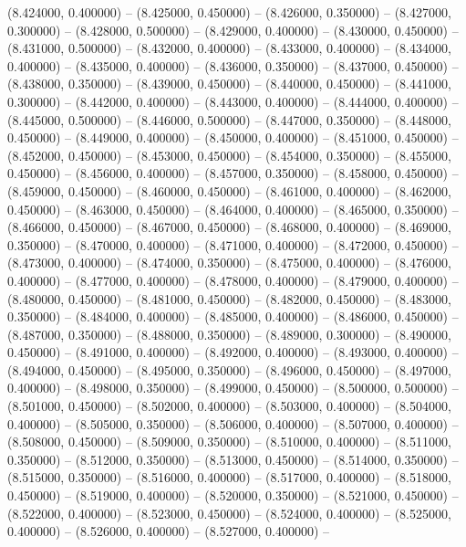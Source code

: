 (8.424000, 0.400000) -- 
(8.425000, 0.450000) -- 
(8.426000, 0.350000) -- 
(8.427000, 0.300000) -- 
(8.428000, 0.500000) -- 
(8.429000, 0.400000) -- 
(8.430000, 0.450000) -- 
(8.431000, 0.500000) -- 
(8.432000, 0.400000) -- 
(8.433000, 0.400000) -- 
(8.434000, 0.400000) -- 
(8.435000, 0.400000) -- 
(8.436000, 0.350000) -- 
(8.437000, 0.450000) -- 
(8.438000, 0.350000) -- 
(8.439000, 0.450000) -- 
(8.440000, 0.450000) -- 
(8.441000, 0.300000) -- 
(8.442000, 0.400000) -- 
(8.443000, 0.400000) -- 
(8.444000, 0.400000) -- 
(8.445000, 0.500000) -- 
(8.446000, 0.500000) -- 
(8.447000, 0.350000) -- 
(8.448000, 0.450000) -- 
(8.449000, 0.400000) -- 
(8.450000, 0.400000) -- 
(8.451000, 0.450000) -- 
(8.452000, 0.450000) -- 
(8.453000, 0.450000) -- 
(8.454000, 0.350000) -- 
(8.455000, 0.450000) -- 
(8.456000, 0.400000) -- 
(8.457000, 0.350000) -- 
(8.458000, 0.450000) -- 
(8.459000, 0.450000) -- 
(8.460000, 0.450000) -- 
(8.461000, 0.400000) -- 
(8.462000, 0.450000) -- 
(8.463000, 0.450000) -- 
(8.464000, 0.400000) -- 
(8.465000, 0.350000) -- 
(8.466000, 0.450000) -- 
(8.467000, 0.450000) -- 
(8.468000, 0.400000) -- 
(8.469000, 0.350000) -- 
(8.470000, 0.400000) -- 
(8.471000, 0.400000) -- 
(8.472000, 0.450000) -- 
(8.473000, 0.400000) -- 
(8.474000, 0.350000) -- 
(8.475000, 0.400000) -- 
(8.476000, 0.400000) -- 
(8.477000, 0.400000) -- 
(8.478000, 0.400000) -- 
(8.479000, 0.400000) -- 
(8.480000, 0.450000) -- 
(8.481000, 0.450000) -- 
(8.482000, 0.450000) -- 
(8.483000, 0.350000) -- 
(8.484000, 0.400000) -- 
(8.485000, 0.400000) -- 
(8.486000, 0.450000) -- 
(8.487000, 0.350000) -- 
(8.488000, 0.350000) -- 
(8.489000, 0.300000) -- 
(8.490000, 0.450000) -- 
(8.491000, 0.400000) -- 
(8.492000, 0.400000) -- 
(8.493000, 0.400000) -- 
(8.494000, 0.450000) -- 
(8.495000, 0.350000) -- 
(8.496000, 0.450000) -- 
(8.497000, 0.400000) -- 
(8.498000, 0.350000) -- 
(8.499000, 0.450000) -- 
(8.500000, 0.500000) -- 
(8.501000, 0.450000) -- 
(8.502000, 0.400000) -- 
(8.503000, 0.400000) -- 
(8.504000, 0.400000) -- 
(8.505000, 0.350000) -- 
(8.506000, 0.400000) -- 
(8.507000, 0.400000) -- 
(8.508000, 0.450000) -- 
(8.509000, 0.350000) -- 
(8.510000, 0.400000) -- 
(8.511000, 0.350000) -- 
(8.512000, 0.350000) -- 
(8.513000, 0.450000) -- 
(8.514000, 0.350000) -- 
(8.515000, 0.350000) -- 
(8.516000, 0.400000) -- 
(8.517000, 0.400000) -- 
(8.518000, 0.450000) -- 
(8.519000, 0.400000) -- 
(8.520000, 0.350000) -- 
(8.521000, 0.450000) -- 
(8.522000, 0.400000) -- 
(8.523000, 0.450000) -- 
(8.524000, 0.400000) -- 
(8.525000, 0.400000) -- 
(8.526000, 0.400000) -- 
(8.527000, 0.400000) -- 
